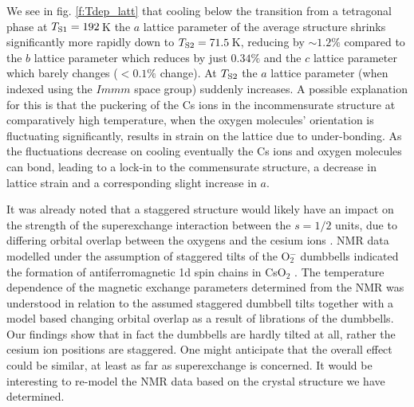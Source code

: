 \documentclass[prb,aps,twocolumn,superscriptaddress,showpacs,footinbib]{revtex4-2}
\newcommand{\cso}{CsO$_{2}$ }
\begin{document}
We see in fig. \ref{f:Tdep_latt} that cooling below the transition from a tetragonal phase at $T_{\rm{S1}}=192$\,K the $a$ lattice parameter of the average structure shrinks significantly more rapidly down to $T_{\rm{S2}}=71.5$\,K, reducing by $\sim 1.2\%$ compared to the $b$ lattice parameter which reduces by just $0.34\%$ and the $c$ lattice parameter which barely changes ($< 0.1\%$ change). At $T_{\rm{S2}}$ the $a$ lattice parameter (when indexed using the $Immm$ space group) suddenly increases. A possible explanation for this is that the puckering of the Cs ions in the incommensurate structure at comparatively high temperature, when the oxygen molecules' orientation is fluctuating significantly, results in strain on the lattice due to under-bonding. As the fluctuations decrease on cooling eventually the Cs ions and oxygen molecules can bond, leading to a lock-in to the commensurate structure, a decrease in lattice strain and a corresponding slight increase in $a$.

It was already noted that a staggered structure would likely have an impact on the strength of the superexchange interaction between the $s=1/2$ units, due to differing orbital overlap between the oxygens and the cesium ions \cite{Klanjsek2015}. NMR data modelled under the assumption of staggered tilts of the O$_{2}^{-}$ dumbbells indicated the formation of antiferromagnetic 1d spin chains in \cso. The temperature dependence of the magnetic exchange parameters determined from the NMR was understood in relation to the assumed staggered dumbbell tilts together with a model based changing orbital overlap as a result of librations of the dumbbells. Our findings show that in fact the dumbbells are hardly tilted at all, rather the cesium ion positions are staggered. One might anticipate that the overall effect could be similar, at least as far as superexchange is concerned. It would be interesting to re-model the NMR data based on the crystal structure we have determined.
\end{document}
